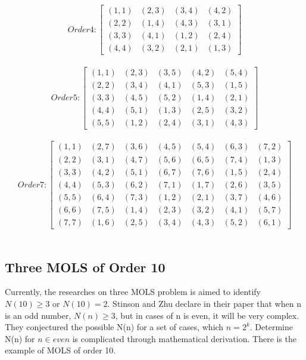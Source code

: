\documentclass[12pt]{article}
\begin{document}
\[Order 4:\begin{bmatrix}(1,1) & (2,3) & (3,4) & (4,2)\\
                         (2,2) & (1,4) & (4,3) & (3,1)\\
                         (3,3) & (4,1) & (1,2) & (2,4)\\
                         (4,4) & (3,2) & (2,1) & (1,3) \end{bmatrix} \]\\

\[Order 5:\begin{bmatrix}(1,1) & (2,3) & (3,5) & (4,2) & (5,4)\\
                         (2,2) & (3,4) & (4,1) & (5,3) & (1,5)\\
                         (3,3) & (4,5) & (5,2) & (1,4) & (2,1)\\
                         (4,4) & (5,1) & (1,3) & (2,5) & (3,2)\\
                         (5,5) & (1,2) & (2,4) & (3,1) & (4,3) \end{bmatrix} \]\\

\[Order 7:\begin{bmatrix}(1,1) & (2,7) & (3,6) & (4,5) & (5,4) & (6,3) & (7,2)\\
                         (2,2) & (3,1) & (4,7) & (5,6) & (6,5) & (7,4) & (1,3)\\
                         (3,3) & (4,2) & (5,1) & (6,7) & (7,6) & (1,5) & (2,4)\\
                         (4,4) & (5,3) & (6,2) & (7,1) & (1,7) & (2,6) & (3,5)\\
                         (5,5) & (6,4) & (7,3) & (1,2) & (2,1) & (3,7) & (4,6)\\
                         (6,6) & (7,5) & (1,4) & (2,3) & (3,2) & (4,1) & (5,7)\\
                         (7,7) & (1,6) & (2,5) & (3,4) & (4,3) & (5,2) & (6,1) \end{bmatrix} \]\\


\subsection{Three MOLS of Order 10}

Currently, the researches on three MOLS problem is aimed to identify $N(10)\ge 3$ or $N(10)= 2$. Stinson and Zhu declare in their paper\cite{ref12} that when n is an odd number, $N(n)\ge 3$, but in cases of n is even, it will be very complex. They conjectured the possible N(n) for a set of cases, which $n = 2^k$. Determine N(n) for $n \in even$ is complicated through mathematical derivation.
There is the example of MOLS of order 10. 
\end{document}

